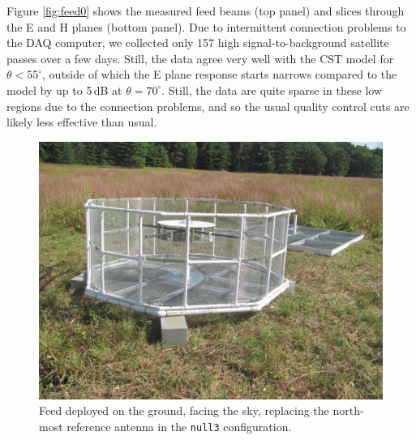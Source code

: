 \documentclass[preprint]{aastex}
\begin{document}
Figure \ref{fig:feed0} shows the measured feed beams (top panel) and slices through the E and H planes (bottom panel). Due to intermittent connection problems to the DAQ computer, we collected only 157 high signal-to-background satellite passes over a few days. Still, the data agree very well with the CST model for $\theta<55^\circ$, outside of which the E plane response starts narrows compared to the model by up to 5\,dB at $\theta=70^\circ$. Still, the data are quite sparse in these low regions due to the connection problems, and so the usual quality control cuts are likely less effective than usual. 

\begin{figure}[h]
\includegraphics[width=5in]{feed.jpg}
\caption{Feed deployed on the ground, facing the sky, replacing the north-most reference antenna in the \texttt{null3} configuration. }
\label{fig:feedpic}
\end{figure}
\end{document}
